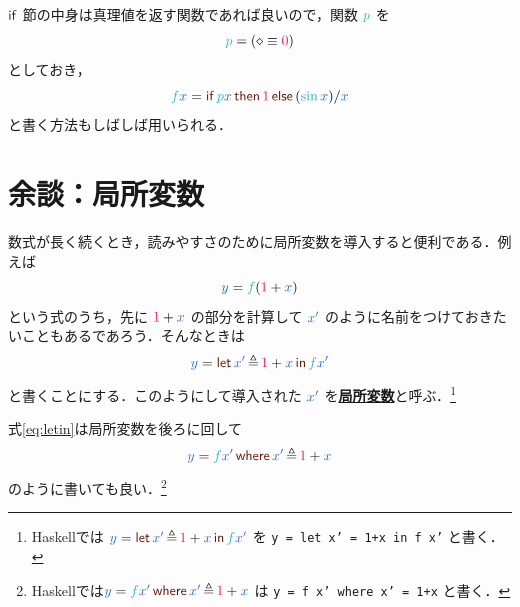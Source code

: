 \documentclass[a5paper,twoside,fleqn,draft]{jsbook}
\def\constantColor{WildStrawberry}
\def\keywordColor{Sepia}
\def\varColor{NavyBlue}
\def\funcColor{BlueGreen}
\newcommand{\programminglanguage}[1]{\textsf{#1}}
\newcommand{\haskell}{\programminglanguage{Haskell}}
\newcommand{\keyword}[1]{{\underline{\textbf{#1}}}}
\newcommand{\code}[1]{\texttt{#1}}
\newcommand{\mKeyword}[1]{\textcolor{\keywordColor}{\mathsf{#1}}}
\newcommand{\mIfKeyword}{\mKeyword{if}}
\newcommand{\mElseKeyword}{\mKeyword{else}}
\newcommand{\mInKeyword}{\mKeyword{in}}
\newcommand{\mLetKeyword}{\mKeyword{let}}
\newcommand{\mOtherwiseKeyword}{\mKeyword{otherwise}}
\newcommand{\mThenKeyword}{\mKeyword{then}}
\newcommand{\mWhereKeyword}{\mKeyword{where}}
\DeclareMathOperator{\mElse}{\mElseKeyword}
\DeclareMathOperator{\mIf}{\mIfKeyword}
\DeclareMathOperator{\mLet}{\mLetKeyword}
\DeclareMathOperator{\mLetIn}{\mInKeyword}
\DeclareMathOperator{\mOtherwise}{\mOtherwiseKeyword}
\DeclareMathOperator{\mThen}{\mThenKeyword}
\DeclareMathOperator{\mWhere}{\mWhereKeyword}
\newcommand{\mConstant}[1]{\textcolor{\constantColor}{#1}}
\newcommand{\mZeroNumber}{{\mConstant{0}}}
\newcommand{\mOneNumber}{{\mConstant{1}}}
\newcommand{\mVar}[1]{\textcolor{\varColor}{#1}}
\newcommand{\mAnonParam}{\diamond}
\newcommand{\mXVar}{\mVar{x}}
\newcommand{\mYVar}{\mVar{y}}
\newcommand{\mXXVar}{\mVar{x'}}
\newcommand{\mFunc}[1]{\textcolor{\funcColor}{#1}}
\newcommand{\mSpecialFunc}[1]{\textcolor{\funcColor}{\textrm{#1}}}
\newcommand{\mFFunc}{{\mFunc{f}}}
\newcommand{\mPFunc}{\mFunc{p}}
\DeclareMathOperator{\mSin}{\mSpecialFunc{sin}}
\DeclareMathOperator{\mLetEq}{\triangleq}
\DeclareMathOperator{\mWhereEq}{\mLetEq}
\begin{document}
$\mIf$ 節の中身は真理値を返す関数であれば良いので，関数 $\mPFunc$ を
\begin{equation}
  \mPFunc
  =(\mAnonParam\equiv\mZeroNumber)
\end{equation}
としておき，
\begin{equation}
  \mFFunc\mXVar
  =\mIf\mPFunc\mXVar
  \mThen\mOneNumber
  \mElse{}(\mSin\mXVar)/\mXVar
\end{equation}
と書く方法もしばしば用いられる．


\section{余談：局所変数}

数式が長く続くとき，読みやすさのために局所変数を導入すると便利である．例えば
\begin{equation}
  \mYVar
  =\mFFunc(\mOneNumber+\mXVar)
\end{equation}
という式のうち，先に $\mOneNumber+\mXVar$ の部分を計算して $\mXXVar$ のように名前をつけておきたいこともあるであろう．そんなときは
\begin{equation}
  \label{eq:letin}
  \mYVar
  =\mLet\mXXVar
  \mLetEq\mOneNumber+\mXVar
  \mLetIn\mFFunc\mXXVar
\end{equation}
と書くことにする．このようにして導入された $\mXXVar$ を\keyword{局所変数}と呼ぶ．\footnote{\haskell では $\mYVar=\mLet\mXXVar\mLetEq\mOneNumber+\mXVar\mLetIn\mFFunc\mXXVar$ を \code{y = let x' = 1+x in f x'} と書く．}

式\eqref{eq:letin}は局所変数を後ろに回して
\begin{equation}
  \label{eq:where}
  \mYVar=\mFFunc\mXXVar\mWhere\mXXVar\mWhereEq\mOneNumber+\mXVar
\end{equation}
のように書いても良い．\footnote{\haskell では$\mYVar=\mFFunc\mXXVar\mWhere\mXXVar\mWhereEq\mOneNumber+\mXVar$ は \code{y = f x' where x' = 1+x} と書く．}
\end{document}

